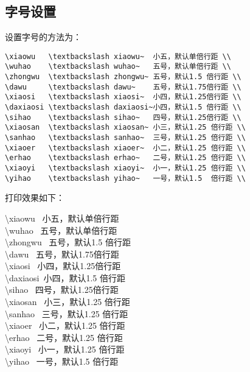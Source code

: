 \subsection{字号设置}
设置字号的方法为：
\begin{lstlisting}
\xiaowu   \textbackslash xiaowu~  小五，默认单倍行距 \\
\wuhao    \textbackslash wuhao~   五号，默认单倍行距 \\
\zhongwu  \textbackslash zhongwu~ 五号，默认1.5 倍行距 \\
\dawu     \textbackslash dawu~    五号，默认1.75倍行距 \\
\xiaosi   \textbackslash xiaosi~  小四，默认1.25倍行距 \\
\daxiaosi \textbackslash daxiaosi~小四，默认1.5 倍行距 \\
\sihao    \textbackslash sihao~   四号，默认1.25倍行距 \\
\xiaosan  \textbackslash xiaosan~ 小三，默认1.25 倍行距 \\
\sanhao   \textbackslash sanhao~  三号，默认1.25 倍行距 \\
\xiaoer   \textbackslash xiaoer~  小二，默认1.25 倍行距 \\
\erhao    \textbackslash erhao~   二号，默认1.25 倍行距 \\
\xiaoyi   \textbackslash xiaoyi~  小一，默认1.25 倍行距 \\
\yihao    \textbackslash yihao~   一号，默认1.5  倍行距 \\
\end{lstlisting}

打印效果如下：

 \begin{flushleft}
 {
\xiaowu   \textbackslash xiaowu~  小五，默认单倍行距 \\
\wuhao    \textbackslash wuhao~   五号，默认单倍行距 \\
\zhongwu  \textbackslash zhongwu~ 五号，默认1.5 倍行距 \\
\dawu     \textbackslash dawu~    五号，默认1.75倍行距 \\
\xiaosi   \textbackslash xiaosi~  小四，默认1.25倍行距 \\
\daxiaosi \textbackslash daxiaosi~小四，默认1.5 倍行距 \\
\sihao    \textbackslash sihao~   四号，默认1.25倍行距 \\
\xiaosan  \textbackslash xiaosan~ 小三，默认1.25 倍行距 \\
\sanhao   \textbackslash sanhao~  三号，默认1.25 倍行距 \\
\xiaoer   \textbackslash xiaoer~  小二，默认1.25 倍行距 \\
\erhao    \textbackslash erhao~   二号，默认1.25 倍行距 \\
\xiaoyi   \textbackslash xiaoyi~  小一，默认1.25 倍行距 \\
\yihao    \textbackslash yihao~   一号，默认1.5  倍行距 \\
}
\end{flushleft}

